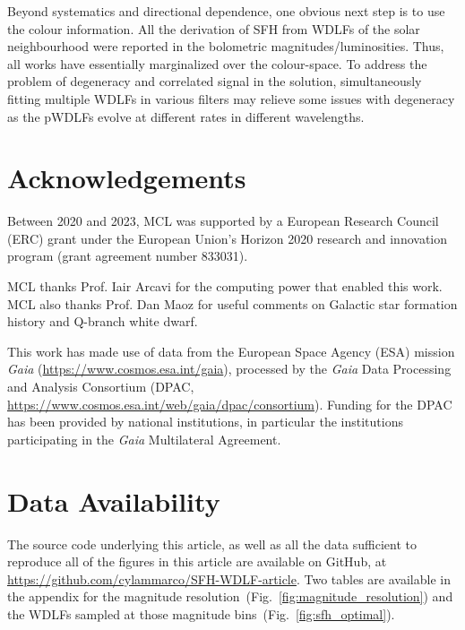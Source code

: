 \documentclass[fleqn,usenatbib]{mnras}
\begin{document}
Beyond systematics and directional dependence, one obvious next step is to use
the colour information. All the derivation of SFH from WDLFs of the solar 
neighbourhood were reported in the bolometric magnitudes/luminosities. Thus,
all works have essentially marginalized over the colour-space. To address the
problem of degeneracy and correlated signal in the solution, simultaneously
fitting multiple WDLFs in various filters may relieve some issues with degeneracy
as the pWDLFs evolve at different rates in different wavelengths.


\section*{Acknowledgements}
Between 2020 and 2023, MCL was supported by a European Research Council (ERC)
grant under the European Union’s Horizon 2020 research and innovation program
(grant agreement number 833031).

MCL thanks Prof. Iair Arcavi for the computing power that enabled this work.
MCL also thanks Prof. Dan Maoz for useful comments on Galactic star formation
history and Q-branch white dwarf.

This work has made use of data from the European Space Agency (ESA) mission
\textit{Gaia} (\url{https://www.cosmos.esa.int/gaia}), processed by the \textit{Gaia}
Data Processing and Analysis Consortium (DPAC,
\url{https://www.cosmos.esa.int/web/gaia/dpac/consortium}). Funding for the DPAC
has been provided by national institutions, in particular the institutions
participating in the \textit{Gaia} Multilateral Agreement.


\section*{Data Availability}
The source code underlying this article, as well as all the data sufficient to
reproduce all of the figures in this article are available on GitHub, at 
\url{https://github.com/cylammarco/SFH-WDLF-article}. Two tables are available
in the appendix for the magnitude
resolution~(Fig.~\ref{fig:magnitude_resolution}) and the WDLFs sampled at those
magnitude bins~(Fig.~\ref{fig:sfh_optimal}).


\end{document}
